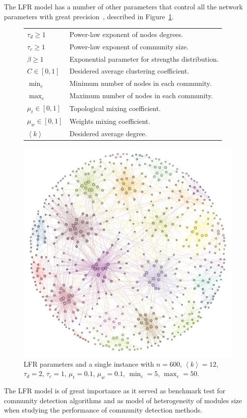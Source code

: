 The LFR model has a number of other parameters that control all the network parameters with great precision~\cite{lancichinetti2008,lancichinetti2009a}, described in Figure~\ref{tab:lfrparams}.
\begin{figure}[htb!]\centering
\begin{footnotesize}
\noindent\begin{minipage}[b!]{0.48\textwidth}
\begin{tabular}{l|p{}}
\hline
$\tau_d \geq 1$ & Power-law exponent of nodes degrees.\\
$\tau_c \geq 1$ & Power-law exponent of community size.\\
$\beta \geq 1$  &Exponential parameter for strengths distribution.\\
$C \in [0,1]$ & Desidered average clustering coefficient.\\
$\min_c$ & Minimum number of nodes in each community.\\
$\max_c$  & Maximum number of nodes in each community.\\
$\mu_t \in [0,1]$ & Topological mixing coefficient.\\
$\mu_w \in [0,1]$ & Weights mixing coefficient.\\
$\left<k\right>$ &Desidered average degree.\\
\hline
\end{tabular}
\end{minipage}\hfill
\begin{minipage}[b!]{0.35\textwidth}\flushright
\includegraphics[width=1\textwidth]{images/LFRexample.pdf}
\end{minipage}
\end{footnotesize}
\caption{LFR parameters and a single instance with $n=600$, $\left<k \right>=12$, $\tau_d=2$, $\tau_c=1$, $\mu_t=0.1$, $\mu_w=0.1$, $\min_c=5$, $\max_c=50$.}
\label{tab:lfrparams}
\end{figure}

The LFR model is of great importance as it served as benchmark test for community detection algorithms and as model of heterogeneity of modules size when studying the performance of community detection methods.


